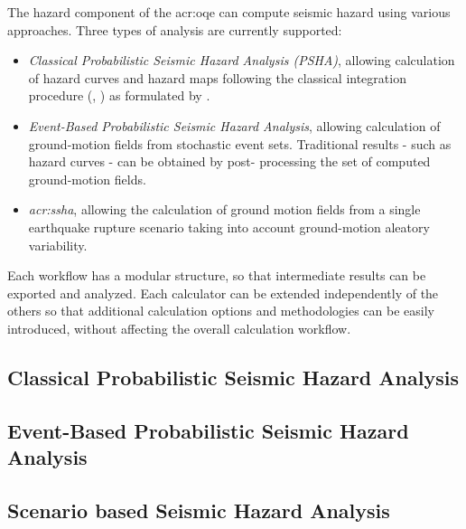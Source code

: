 The hazard component of the \glsdesc{acr:oqe} can compute seismic hazard using
various approaches. Three types of analysis are currently supported:

\begin{itemize}

	\item \textit{Classical Probabilistic Seismic Hazard Analysis (PSHA)},
	allowing calculation of hazard curves and hazard maps following the
	classical integration procedure (\cite{cornell1968}, \citet{mcguire1976})
	as formulated by \cite{field2003}.

	\item \textit{Event-Based Probabilistic Seismic Hazard Analysis},
	allowing calculation of ground-motion fields from stochastic event sets.
	Traditional results - such as hazard curves - can be obtained by post-
	processing the set of computed ground-motion fields.

	\item \textit{\gls{acr:ssha}}, allowing the calculation of ground
	motion fields from a single earthquake rupture scenario taking into
	account ground-motion aleatory variability.

\end{itemize}

Each workflow has a modular structure, so that intermediate results can be
exported and analyzed. Each calculator can be extended independently of the
others so that additional calculation options and methodologies can be easily
introduced, without affecting the overall calculation workflow.



\subsection{Classical Probabilistic Seismic Hazard Analysis}
\label{subsec:classical_psha}


\subsection{Event-Based Probabilistic Seismic Hazard Analysis}
\label{subsec:event_based_psha}


\subsection{Scenario based Seismic Hazard Analysis}
\label{subsec:scenario_hazard}


\cleardoublepage